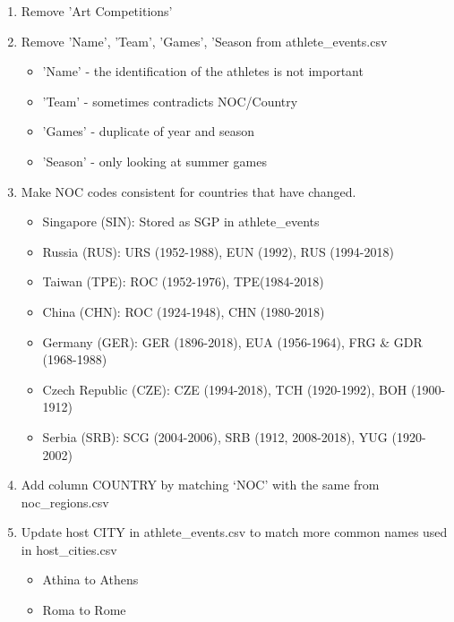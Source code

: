 \documentclass[a4 paper, 12pt]{article}
\begin{document}
        \begin{enumerate}
            \item Remove 'Art Competitions' 
            \item Remove 'Name', 'Team', 'Games', 'Season from athlete\_events.csv
                \begin{itemize}
                    \item 'Name' - the identification of the athletes is not important
                    \item 'Team' - sometimes contradicts NOC/Country
                    \item 'Games' - duplicate of year and season
                    \item 'Season' - only looking at summer games
                \end{itemize}            
            \item Make NOC codes consistent for countries that have changed.            
               \begin{itemize}
                    \item Singapore (SIN): Stored as SGP in athlete\_events
                    \item Russia (RUS): URS (1952-1988), EUN (1992), RUS (1994-2018)
                    \item Taiwan (TPE): ROC (1952-1976), TPE(1984-2018)
                    \item China (CHN): ROC (1924-1948), CHN (1980-2018)
                    \item Germany (GER): GER (1896-2018), EUA (1956-1964), FRG \& GDR (1968-1988)
                    \item Czech Republic (CZE): CZE (1994-2018), TCH (1920-1992), BOH (1900-1912)
                    \item Serbia (SRB): SCG (2004-2006), SRB (1912, 2008-2018), YUG (1920-2002)
                \end{itemize}            
            \item Add column COUNTRY by matching ‘NOC’ with the same from noc\_regions.csv
            \item Update host CITY in athlete\_events.csv to match more common names used in host\_cities.csv
                \begin{itemize}
                    \item Athina to Athens
                    \item Roma to Rome 

\end{itemize}
\end{enumerate}
\end{document}
